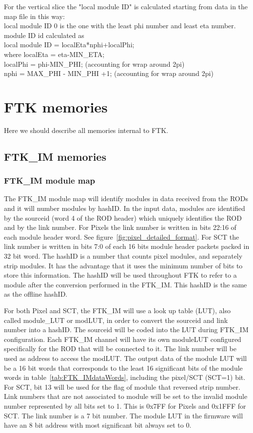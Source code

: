 \documentclass[10pt]{article}
\numberwithin{figure}{section}
\numberwithin{equation}{section}
\numberwithin{table}{section}
\newcommand{\0}{\phantom{0}}
\begin{document}
For the vertical slice the "local module ID"  is calculated starting from data in the map file in this way: \\
local module ID 0 is the one with the least phi number and least eta number.\\
module ID id calculated as \\
local module ID = localEta*nphi+localPhi; \\
where localEta = eta-MIN\_ETA; \\
localPhi = phi-MIN\_PHI; (accounting for wrap around 2pi) \\
nphi = MAX\_PHI - MIN\_PHI +1; (accounting for wrap around 2pi) 

\newpage

\section{FTK memories}
Here we should describe all memories internal to FTK.

\subsection{FTK\_IM memories}
\subsubsection{FTK\_IM module map}
The FTK\_IM module map will identify modules in data received from the RODs and it will number modules by hashID.
In the input data, modules are identified by the sourceid (word 4 of the ROD header) which uniquely identifies the ROD and by the link number.
For Pixels the link number is written in bits 22:16 of each module header word. See figure~\ref{fig:pixel_detailed_format}.
For SCT the link number is written in bits 7:0 of each 16 bits module header packets packed in 32 bit word.
The hashID is a number that counts pixel modules, and separately strip modules.
It has the advantage that it uses the minimum number of bits to store this information. The hashID will be used throughout FTK to refer to a module after the conversion performed in the FTK\_IM. This hashID is the same as the offline hashID.

For both Pixel and SCT, the FTK\_IM will use a look up table (LUT), also called module\_LUT or modLUT, in order to convert the sourceid and link number into a hashID.
The sourceid will be coded into the LUT during FTK\_IM configuration. Each FTK\_IM channel will have its own moduleLUT configured specifically for the ROD that will be connected to it.
The link number will be used as address to access the modLUT. The output data of the module LUT will be a 16 bit words that corresponds to the least 16 significant bits of the module words in table~\ref{tab:FTK_IMdataWords}, including the pixel/SCT (SCT=1) bit. For SCT, bit 13 will be used for the flag of module that reversed strip number.
Link numbers that are not associated to module will be set to the invalid module number represented by all bits set to 1. This is 0x7FF for Pixels and 0x1FFF for SCT.
The link number is a 7 bit number. The module LUT in the firmware will have an 8 bit address with most significant bit always set to 0. 
\end{document}
